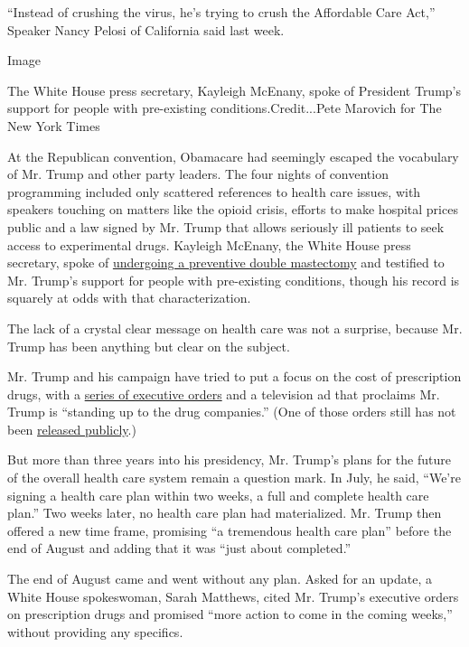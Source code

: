 ``Instead of crushing the virus, he's trying to crush the Affordable
Care Act,'' Speaker Nancy Pelosi of California said last week.

Image

The White House press secretary, Kayleigh McEnany, spoke of President
Trump's support for people with pre-existing conditions.Credit...Pete
Marovich for The New York Times

At the Republican convention, Obamacare had seemingly escaped the
vocabulary of Mr. Trump and other party leaders. The four nights of
convention programming included only scattered references to health care
issues, with speakers touching on matters like the opioid crisis,
efforts to make hospital prices public and a law signed by Mr. Trump
that allows seriously ill patients to seek access to experimental drugs.
Kayleigh McEnany, the White House press secretary, spoke of
\href{https://www.nytimes3xbfgragh.onion/live/2020/08/26/us/rnc-convention-election/kayleigh-mcenany-tells-a-personal-story-in-a-bid-to-make-trump-more-appealing-to-women}{undergoing
a preventive double mastectomy} and testified to Mr. Trump's support for
people with pre-existing conditions, though his record is squarely at
odds with that characterization.

The lack of a crystal clear message on health care was not a surprise,
because Mr. Trump has been anything but clear on the subject.

Mr. Trump and his campaign have tried to put a focus on the cost of
prescription drugs, with a
\href{https://www.nytimes3xbfgragh.onion/2020/07/24/us/politics/trump-drug-prices-coronavirus.html}{series
of executive orders} and a television ad that proclaims Mr. Trump is
``standing up to the drug companies.'' (One of those orders still has
not been
\href{https://www.nytimes3xbfgragh.onion/2020/08/24/us/politics/trump-drug-prices.html}{released
publicly}.)

But more than three years into his presidency, Mr. Trump's plans for the
future of the overall health care system remain a question mark. In
July, he said, ``We're signing a health care plan within two weeks, a
full and complete health care plan.'' Two weeks later, no health care
plan had materialized. Mr. Trump then offered a new time frame,
promising ``a tremendous health care plan'' before the end of August and
adding that it was ``just about completed.''

The end of August came and went without any plan. Asked for an update, a
White House spokeswoman, Sarah Matthews, cited Mr. Trump's executive
orders on prescription drugs and promised ``more action to come in the
coming weeks,'' without providing any specifics.

